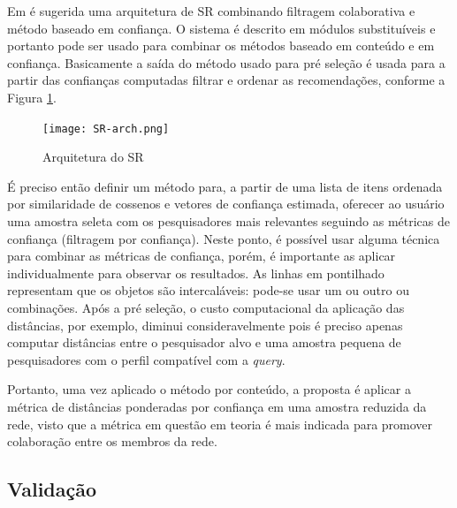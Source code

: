 \documentclass[12pt]{article}
\begin{document}
Em \cite{massa2004trust} é sugerida uma arquitetura de SR combinando filtragem colaborativa e método baseado em confiança. 
O sistema é descrito em módulos substituíveis e portanto pode ser usado para combinar os métodos baseado em conteúdo e em 
confiança. Basicamente a saída do método usado para pré seleção é usada para a partir das confianças computadas filtrar e 
ordenar as recomendações, conforme a Figura \ref{fig:sr-arch}.

\begin{center}
 \begin{figure}[ht]
   \texttt{[image: SR-arch.png]}
   \caption{Arquitetura do SR}
   \label{fig:sr-arch}
 \end{figure}
\end{center}

É preciso então definir um método para, a partir de uma lista de itens ordenada por similaridade de cossenos e vetores de 
confiança estimada, oferecer ao usuário uma amostra seleta com os pesquisadores mais relevantes seguindo as métricas de confiança
(filtragem por confiança). Neste ponto, é possível usar alguma técnica para combinar as métricas de confiança, porém, é importante 
as aplicar individualmente para observar os resultados. As linhas em pontilhado representam que os objetos são intercaláveis: 
pode-se usar um ou outro ou combinações. Após a pré seleção, o custo computacional da aplicação das distâncias, por exemplo, 
diminui consideravelmente pois é preciso apenas computar distâncias entre  o pesquisador alvo e uma amostra pequena de 
pesquisadores com o perfil compatível com a \textit{query}.

Portanto, uma vez aplicado o método por conteúdo, a proposta é aplicar a métrica de distâncias ponderadas por confiança em uma 
amostra reduzida da rede, visto que a métrica em questão em teoria é mais indicada para promover colaboração entre os membros da 
rede.

\subsection{Validação} \label{sect:validation}



\end{document}
